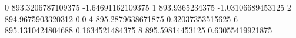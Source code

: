 0 893.3206787109375 -1.64691162109375
1 893.9365234375 -1.03106689453125
2 894.9675903320312 0.0
4 895.2879638671875 0.32037353515625
6 895.1310424804688 0.1634521484375
8 895.59814453125 0.63055419921875
